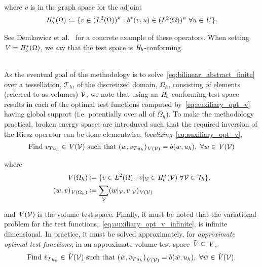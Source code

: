 where $v$ is in the graph space for the adjoint
\begin{align}
\mathit{{{H}}}_b^*(\Omega) \coloneqq
\{ v \in (L^2(\Omega))^n : b^*(v,u) \in (L^2(\Omega))^n\ \forall u \in \mathit{{{U}}} \}.
\end{align}

See Demkowicz et al.~\cite[eq. ()]{Demkowicz2014_overview} for a concrete example of these operators.
When setting $\mathit{{{V}}} = \mathit{{{H}}}_b^*(\Omega)$, we say that the test space is $\mathit{{{H}}}_b$-conforming.
\\~

As the eventual goal of the methodology is to solve~\eqref{eq:bilinear_abstract_finite} over a tessellation,
$\mathcal{T}_h$, of the discretized domain, $\Omega_h$, consisting of elements (referred to as volumes) $\mathcal{{{V}}}$, we
note that using an $\mathit{{{H}}}_b$-conforming test space results in each of the optimal test functions computed
by~\eqref{eq:auxiliary_opt_v} having global support (i.e. potentially over all of $\Omega_h$).  To make the methodology
practical, broken energy spaces are introduced such that the required inversion of the Riesz operator can be done
elementwise, \emph{localizing}~\eqref{eq:auxiliary_opt_v},
\begin{align} \label{eq:auxiliary_opt_v_infinite}
\text{Find}\ v_{T u_h} \in \mathit{{{V}}}(\mathcal{{{V}}})\ \text{such that}\
(w,v_{T u_h})_{\mathit{{{V}}}(\mathcal{{{V}}})} = b(w,u_h),\ \forall w \in \mathit{{{V}}}(\mathcal{{{V}}})
\end{align}

where 
\begin{align}
\mathit{{{V}}}(\Omega_h) 
&\coloneqq
\{ v \in L^2(\Omega) : v|_{\mathcal{{{V}}}} \in \mathit{{{H}}}_b^*(\mathcal{{{V}}})\ \forall \mathcal{{{V}}} \in \mathcal{T}_h \}, \\
(w,v)_{\mathit{{{V}}}(\Omega_h)}
&\coloneqq
\sum_{\mathcal{{{V}}}} (w|_{\mathcal{{{V}}}},v|_{\mathcal{{{V}}}})_{\mathit{{{V}}}(\mathcal{{{V}}})}
\end{align}

and $\mathit{{{V}}}(\mathcal{{{V}}})$ is the volume test space. Finally, it must be noted that the variational problem for the test
functions,~\eqref{eq:auxiliary_opt_v_infinite}, is infinite dimensional. In practice, it must be solved approximately, for
\textit{approximate optimal test functions}, in an approximate volume test space $\tilde{\mathit{{{V}}}} \subseteq \mathit{{{V}}}$,
\begin{align} \label{eq:auxiliary_opt_v_finite}
\text{Find}\ \tilde{v}_{T u_h} \in \afspace{V}(\fe{V})\ \text{such that}\
(\tilde{w},\tilde{v}_{T u_h})_{\afspace{V}(\fe{V})} = b(\tilde{w},u_h),\ \forall \tilde{w} \in \afspace{V}(\fe{V}),
\end{align}

